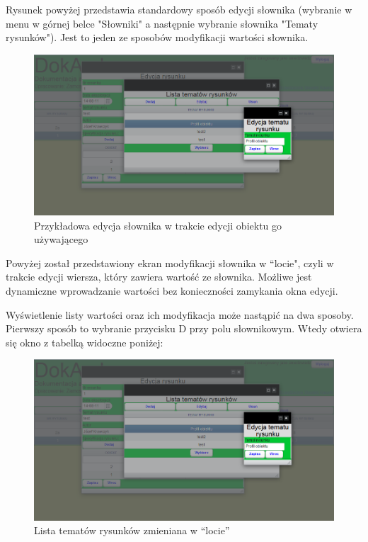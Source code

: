 Rysunek powyżej przedstawia standardowy sposób edycji słownika (wybranie w menu w górnej belce "Słowniki" a następnie wybranie słownika "Tematy rysunków"). Jest to jeden ze sposobów modyfikacji wartości słownika.

\begin{figure} [H]
    \begin{center}
	\includegraphics[scale=.6]{img/edycjaSlownikaWLocie.png}
	\caption{Przykładowa edycja słownika w trakcie edycji obiektu go używającego}
	\label{edycjaSlownikaWLocie}
    \end{center}
\end{figure}

\newpage
Powyżej został przedstawiony ekran modyfikacji słownika w ``locie", czyli w trakcie edycji wiersza, który zawiera wartość ze słownika. Możliwe jest dynamiczne wprowadzanie wartości bez konieczności zamykania okna edycji.

Wyświetlenie listy wartości oraz ich modyfikacja może nastąpić na dwa sposoby. Pierwszy sposób to wybranie przycisku D przy polu słownikowym. Wtedy otwiera się okno z tabelką widoczne poniżej:

\begin{figure} [H]
    \begin{center}
	\includegraphics[scale=.6]{img/edycjaSlownikaWLocie.png}
	\caption{Lista tematów rysunków zmieniana w ``locie''}
	\label{edycjaListySlownikaWLocie}
    \end{center}
\end{figure}

